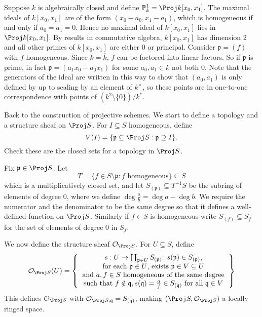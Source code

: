 \documentclass[a4paper]{article}
\renewcommand*{\P}{\mathbb{P}}
\newcommand{\sh}[1]{\mathcal{#1}} %
\begin{document}
\begin{eg}
  Suppose \(k\) is algebraically closed and define \(\P^1_k = \Proj k[x_0, x_1]\). The maximal ideals of \(k[x_0, x_1]\) are of the form \((x_0 - a_0, x_1 - a_1)\), which is homogeneous if and only if \(a_0 = a_1 = 0\). Hence no maximal ideal of \(k[x_0, x_1]\) lies in \(\Proj k[x_0, x_1]\). By results in commutative algebra, \(k[x_0, x_1]\) has dimension \(2\) and all other primes of \(k[x_0, x_1]\) are either \(0\) or principal. Consider \(\mathfrak p = (f)\) with \(f\) homogeneous. Since \(k = \overline k\), \(f\) can be factored into linear factors. So if \(\mathfrak p\) is prime, in fact \(\mathfrak p = (a_1 x_0 - a_0 x_1)\) for some \(a_0, a_1 \in k\) not both \(0\). Note that the generators of the ideal are written in this way to show that \((a_0, a_1)\) is only defined by up to scaling by an element of \(k^\times\), so these points are in one-to-one correspondence with points of \((k^2 \setminus \{0\})/k^*\).
\end{eg}

Back to the construction of projective schemes. We start to define a topology and a structure sheaf on \(\Proj S\). For \(I \subseteq S\) homogeneous, define
\[
  V(I) = \{\mathfrak p \subseteq \Proj S: \mathfrak p \supseteq I\}.
\]
Check these are the closed sets for a topology in \(\Proj S\).

Fix \(\mathfrak p \in \Proj S\). Let
\[
  T = \{f \in S \setminus \mathfrak p: f \text{ homogeneous}\} \subseteq S
\]
which is a multiplicatively closed set, and let \(S_{(\mathfrak p)} \subseteq T^{-1}S\) be the subring of elements of degree \(0\), where we define \(\deg \frac{a}{b} = \deg a - \deg b\). We require the numerator and the denominator to be the same degree so that it defines a well-defined function on \(\Proj S\). Similarly if \(f \in S\) is homogeneous  write \(S_{(f)} \subseteq S_f\) for the set of elements of degree \(0\) in \(S_f\).

We now define the structure sheaf \(\sh O_{\Proj S}\). For \(U \subseteq S\), define
\[
  \sh O_{\Proj S}(U) =
  \left\{
    \begin{tabular}{c}
      \(s: U \to \coprod_{\mathfrak p \in U} S_{(\mathfrak p)}\): \(s(\mathfrak p) \in S_{(\mathfrak p)}\), \\
      for each \(\mathfrak p \in U\), exists \(\mathfrak p \in V \subseteq U\) \\
      and \(a, f \in S\) homogeneous of the same degree \\
      such that \(f \notin \mathfrak q, s(\mathfrak q) = \frac{a}{f} \in S_{(\mathfrak q)}\) for all \(\mathfrak q \in V\)
    \end{tabular}
  \right\}
\]
This defines \(\sh O_{\Proj S}\) with \(\sh O_{\Proj S, \mathfrak q} = S_{(\mathfrak q)}\), making \((\Proj S, \sh O_{\Proj S})\) a locally ringed space.
\end{document}
